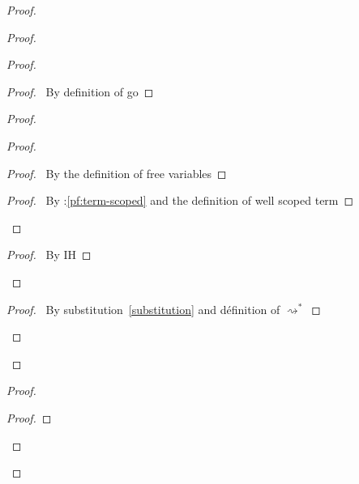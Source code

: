 \documentclass[a4paper]{article}
\begin{document}
\begin{proof}
\begin{proof}
\begin{proof}
      \begin{proof}
        \pf\ By definition of \textsf{go}
      \end{proof}
      \begin{proof}
        \begin{proof}
          \begin{proof}
            \pf\ By the definition of free variables
          \end{proof}
          \qedstep
          \begin{proof}
            \pf\ By \toplevel:\ref{pf:term-scoped} and the definition of well scoped term
          \end{proof}
        \end{proof}
        \qedstep
        \begin{proof}
          \pf\ By IH
        \end{proof}
      \end{proof}
      \begin{proof}
        \pf\ By substitution~\ref{substitution} and définition of $\rightsquigarrow^*$
      \end{proof}
    \end{proof}
  \end{proof}
  \begin{proof}
    \begin{proof}

\end{proof}
\end{proof}
\end{proof}
\end{document}
